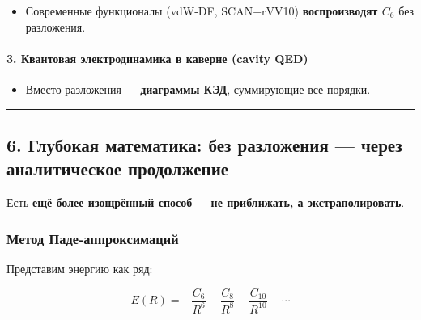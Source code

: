 \documentclass[11pt]{article}
\providecommand{\tightlist}{%
      \setlength{\itemsep}{0pt}\setlength{\parskip}{0pt}}
\begin{document}
\begin{itemize}
\tightlist
\item
  Современные функционалы (vdW-DF, SCAN+rVV10) \textbf{воспроизводят
  \(C_6\)} без разложения.
\end{itemize}

\paragraph{\texorpdfstring{3. \textbf{Квантовая электродинамика в
каверне (cavity
QED)}}{3. Квантовая электродинамика в каверне (cavity QED)}}\label{ux43aux432ux430ux43dux442ux43eux432ux430ux44f-ux44dux43bux435ux43aux442ux440ux43eux434ux438ux43dux430ux43cux438ux43aux430-ux432-ux43aux430ux432ux435ux440ux43dux435-cavity-qed}

\begin{itemize}
\tightlist
\item
  Вместо разложения --- \textbf{диаграммы КЭД}, суммирующие все порядки.
\end{itemize}

\begin{center}\rule{0.5\linewidth}{\linethickness}\end{center}

\subsection{6. Глубокая математика: без разложения --- через
аналитическое
продолжение}\label{ux433ux43bux443ux431ux43eux43aux430ux44f-ux43cux430ux442ux435ux43cux430ux442ux438ux43aux430-ux431ux435ux437-ux440ux430ux437ux43bux43eux436ux435ux43dux438ux44f-ux447ux435ux440ux435ux437-ux430ux43dux430ux43bux438ux442ux438ux447ux435ux441ux43aux43eux435-ux43fux440ux43eux434ux43eux43bux436ux435ux43dux438ux435}

Есть \textbf{ещё более изощрённый способ} --- \textbf{не приближать, а
экстраполировать}.

\subsubsection{\texorpdfstring{Метод
\textbf{Паде-аппроксимаций}}{Метод Паде-аппроксимаций}}\label{ux43cux435ux442ux43eux434-ux43fux430ux434ux435-ux430ux43fux43fux440ux43eux43aux441ux438ux43cux430ux446ux438ux439}

Представим энергию как ряд:

\[
E(R) = -\frac{C_6}{R^6} - \frac{C_8}{R^8} - \frac{C_{10}}{R^{10}} - \cdots
\]
\end{document}
